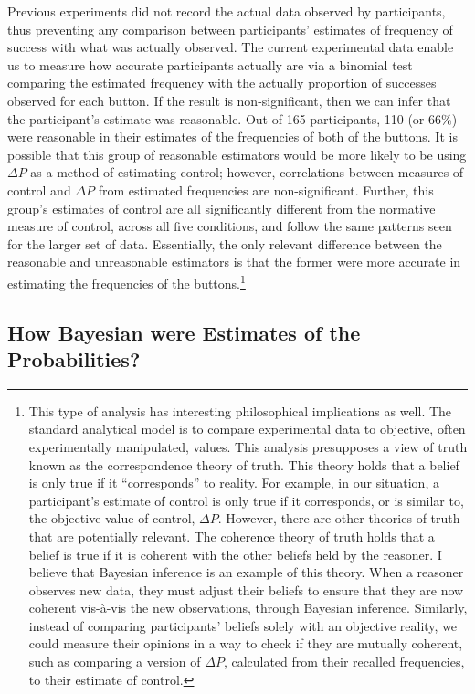 \documentclass[USenglish,letterpaper,12pt,extrafontsizes,oneside,onecolumn,final]{memoir}
\newcommand{\deltap}{$\Delta P$}
\begin{document}
Previous experiments did not record the actual data observed by participants, thus preventing any comparison between participants' estimates of frequency of success with what was actually observed.  The current experimental data enable us to measure how accurate participants actually are via a binomial test comparing the estimated frequency with the actually proportion of successes observed for each button.  If the result is non-significant, then we can infer that the participant's estimate was reasonable.  Out of 165 participants, 110 (or 66\%) were reasonable in their estimates of the frequencies of both of the buttons. It is possible that this group of reasonable estimators would be more likely to be using \deltap \xspace as a method of estimating control; however, correlations between measures of control and \deltap \xspace from estimated frequencies are non-significant.  Further, this group's estimates of control are all significantly different from the normative measure of control, across all five conditions, and follow the same patterns seen for the larger set of data.  Essentially, the only relevant difference between the reasonable and unreasonable estimators is that the former were more accurate in estimating the frequencies of the buttons.\footnote{This type of analysis has interesting philosophical implications as well. The standard analytical model is to compare experimental data to objective, often experimentally manipulated, values. This analysis presupposes a view of truth known as the correspondence theory of truth.  This theory holds that a belief is only true if it ``corresponds'' to reality. For example, in our situation, a participant's estimate of control is only true if it corresponds, or is similar to, the objective value of control, \deltap.  However, there are other theories of truth that are potentially relevant.  The coherence theory of truth holds that a belief is true if it is coherent with the other beliefs held by the reasoner.  I believe that Bayesian inference is an example of this theory.  When a reasoner observes new data, they must adjust their beliefs to ensure that they are now coherent vis-\`{a}-vis the new observations, through Bayesian inference.  Similarly, instead of comparing participants' beliefs solely with an objective reality, we could measure their opinions in a way to check if they are mutually coherent, such as comparing a version of \deltap, calculated from their recalled frequencies, to their estimate of control.} 

\subsection{How Bayesian were Estimates of the Probabilities?}
\end{document}
